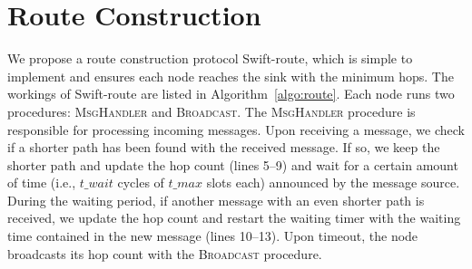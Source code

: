 \documentclass[lettersize,journal]{IEEEtran}
\newcommand{\MyComment}[1]{\State{\textcolor{gray}{// #1}}}
\newcommand{\ours}{Swift\xspace}
\newcommand{\route}{Swift-route\xspace}
\begin{document}
\section{Route Construction}
\label{sec:route}
\begin{algorithm}[!t]
\small
\caption{Route construction protocol \ours-route}\label{algo:route}
\begin{algorithmic}[1]
    \EndIf
    \EndWhile
\EndProcedure

    \MyComment{Maximum attempts to ensure all neighbors are reached}
        \EndWhile
    \EndWhile 
\EndProcedure
\end{algorithmic}
\end{algorithm}

We propose a route construction protocol \route, which is simple to implement and ensures each node reaches the sink with the minimum hops. The workings of \route are listed in Algorithm~\ref{algo:route}. Each node runs two procedures: \textsc{MsgHandler} and \textsc{Broadcast}. The \textsc{MsgHandler} procedure is responsible for processing incoming messages. Upon receiving a message, we check if a shorter path has been found with the received message. If so, we keep the shorter path and update the hop count (lines 5--9) and wait for a certain amount of time (i.e., $t\_wait$ cycles of $t\_max$ slots each) announced by the message source. During the waiting period, if another message with an even shorter path is received, we update the hop count and restart the waiting timer with the waiting time contained in the new message (lines 10--13). Upon timeout, the node broadcasts its hop count with the \textsc{Broadcast} procedure.
\end{document}
